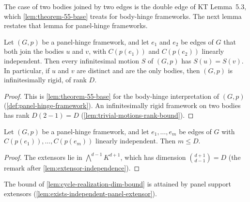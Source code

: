 The case of two bodies joined by two edges is the double edge of KT
Lemma~5.3, which \cref{lem:theorem-55-base} treats for body-hinge
frameworks. The next lemma restates that lemma for panel-hinge
frameworks.

\begin{lemma}
  \label{lem:cycle-realization-base}
  \leanok
  Let $(G,p)$ be a panel-hinge framework, and let $e_1$ and $e_2$ be
  edges of $G$ that both join the bodies $u$ and $v$, with $C(p(e_1))$ and
  $C(p(e_2))$ linearly independent. Then every infinitesimal motion $S$
  of $(G,p)$ has $S(u) = S(v)$. In particular, if $u$ and $v$ are distinct
  and are the only bodies, then $(G,p)$ is infinitesimally rigid, of rank
  $D$.
\end{lemma}
\begin{proof}
  \leanok
  This is \cref{lem:theorem-55-base} for the body-hinge interpretation of
  $(G,p)$ (\cref{def:panel-hinge-framework}). An infinitesimally rigid
  framework on two bodies has rank $D(2 - 1) = D$
  (\cref{lem:trivial-motions-rank-bound}).
\end{proof}

\begin{lemma}
  \label{lem:cycle-realization-dim-bound}
  \leanok
  Let $(G,p)$ be a panel-hinge framework, and let $e_1, \dots, e_m$ be
  edges of $G$ with $C(p(e_1)), \dots, C(p(e_m))$ linearly independent.
  Then $m \le D$.
\end{lemma}
\begin{proof}
  \leanok
  The extensors lie in $\bigwedge^{d-1} K^{d+1}$, which has dimension
  $\binom{d+1}{d-1} = D$ (the remark after
  \cref{lem:extensor-independence}).
\end{proof}

The bound of \cref{lem:cycle-realization-dim-bound} is attained by panel
support extensors (\cref{lem:exists-independent-panel-extensor}).

